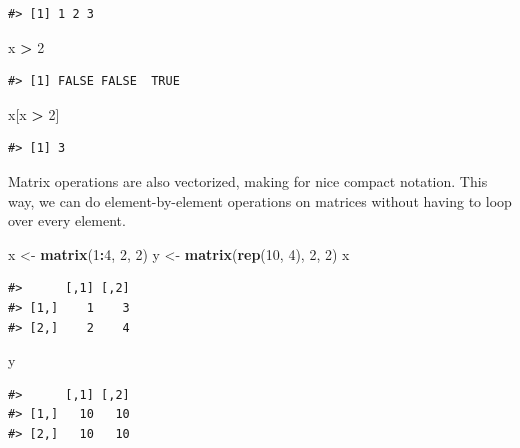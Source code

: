 \documentclass[]{book}
\newenvironment{Shaded}{\begin{snugshade}}{\end{snugshade}}
\newcommand{\KeywordTok}[1]{\textcolor[rgb]{0.13,0.29,0.53}{\textbf{#1}}}
\newcommand{\DecValTok}[1]{\textcolor[rgb]{0.00,0.00,0.81}{#1}}
\newcommand{\StringTok}[1]{\textcolor[rgb]{0.31,0.60,0.02}{#1}}
\newcommand{\OperatorTok}[1]{\textcolor[rgb]{0.81,0.36,0.00}{\textbf{#1}}}
\newcommand{\NormalTok}[1]{#1}
\theoremstyle{definition}
\theoremstyle{definition}
\theoremstyle{definition}
\theoremstyle{remark}
\begin{document}
\begin{verbatim}
#> [1] 1 2 3
\end{verbatim}

\begin{Shaded}
\begin{Highlighting}[]
\NormalTok{x }\OperatorTok{>}\StringTok{ }\DecValTok{2}
\end{Highlighting}
\end{Shaded}

\begin{verbatim}
#> [1] FALSE FALSE  TRUE
\end{verbatim}

\begin{Shaded}
\begin{Highlighting}[]
\NormalTok{x[x }\OperatorTok{>}\StringTok{ }\DecValTok{2}\NormalTok{]}
\end{Highlighting}
\end{Shaded}

\begin{verbatim}
#> [1] 3
\end{verbatim}

Matrix operations are also vectorized, making for nice compact notation.
This way, we can do element-by-element operations on matrices without
having to loop over every element.

\begin{Shaded}
\begin{Highlighting}[]
\NormalTok{x <-}\StringTok{ }\KeywordTok{matrix}\NormalTok{(}\DecValTok{1}\OperatorTok{:}\DecValTok{4}\NormalTok{, }\DecValTok{2}\NormalTok{, }\DecValTok{2}\NormalTok{)}
\NormalTok{y <-}\StringTok{ }\KeywordTok{matrix}\NormalTok{(}\KeywordTok{rep}\NormalTok{(}\DecValTok{10}\NormalTok{, }\DecValTok{4}\NormalTok{), }\DecValTok{2}\NormalTok{, }\DecValTok{2}\NormalTok{)}
\NormalTok{x}
\end{Highlighting}
\end{Shaded}

\begin{verbatim}
#>      [,1] [,2]
#> [1,]    1    3
#> [2,]    2    4
\end{verbatim}

\begin{Shaded}
\begin{Highlighting}[]
\NormalTok{y}
\end{Highlighting}
\end{Shaded}

\begin{verbatim}
#>      [,1] [,2]
#> [1,]   10   10
#> [2,]   10   10
\end{verbatim}
\end{document}
